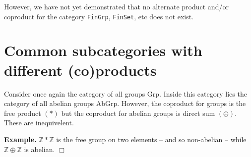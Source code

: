 \documentclass[12pt]{article}
\begin{document}
However, we have not yet demonstrated that no alternate product and/or coproduct for the category \texttt{FinGrp}, \texttt{FinSet}, etc does not exist.


\section{Common subcategories with different (co)products}

Consider once again the category of all groups \textsf{Grp}.  Inside this
category lies the category of all abelian groups \textsf{AbGrp}.  However, the coproduct for groups is the free product $(*)$ but the coproduct for abelian groups is direct sum $(\oplus)$.  These are inequivelent.  

\textbf{Example.} $\mathbb{Z}*\mathbb{Z}$ is the free group on two elements -- and so non-abelian -- while $\mathbb{Z}\oplus\mathbb{Z}$ is abelian. $\Box$
\end{document}
